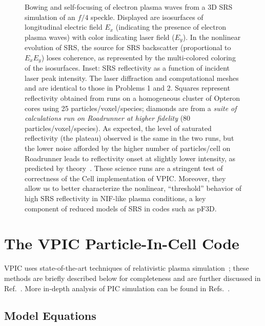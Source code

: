 \documentclass[journal,twoside]{IEEEtran}
\begin{document}
\begin{figure}
\begin{center}
\caption{Bowing and self-focusing of electron plasma waves from a
3D SRS simulation of an $f/4$ speckle. Displayed are isosurfaces of
longitudinal electric field $E_x$ (indicating the presence of electron plasma waves) 
with color indicating laser field ($E_y$).  In the nonlinear evolution of SRS, the source
for SRS backscatter (proportional to $E_x E_y$) loses coherence, as represented
by the multi-colored coloring of the isosurfaces.
Inset: SRS reflectivity as a function of incident laser peak intensity.  The laser 
diffraction and computational meshes and are identical to those in Problems 1 and 2.  
Squares represent reflectivity obtained from runs on a homogeneous cluster of Opteron cores 
using 25 particles/voxel/species; diamonds are from a \textit{suite of calculations run on 
Roadrunner at higher fidelity} (80 particles/voxel/species).
As expected, the level of saturated reflectivity
(the plateau) observed is the same in the two runs, but the lower noise afforded 
by the higher number of particles/cell on Roadrunner leads to reflectivity onset 
at slightly lower intensity, as predicted by theory~\cite{Yin_et_al_Phys_Plasmas_2006}.  
These science runs are a stringent test of correctness of the Cell implementation 
of VPIC.  Moreover, they allow us to better characterize the nonlinear, ``threshold'' 
behavior of high SRS reflectivity in NIF-like plasma conditions, a key component of 
reduced models of SRS in codes such as pF3D. 
}
\label{fig:lpi}
\end{center}
\end{figure}

\section{The VPIC Particle-In-Cell Code}

VPIC uses state-of-the-art techniques of relativistic plasma
simulation~\cite{Blahovec_et_al_2000,Eastwood_et_al_1995,Jones_et_al_1996,Kwan_Snell_1985,Nieter_Cary_2004,Verboncoeur_et_al_1995};
these methods are briefly described below for completeness and are
further discussed in Ref.~\cite{Bowers_et_al_Phys_Plasmas_2007}.  More
in-depth analysis of PIC simulation can be found in
Refs.~\cite{Birdsall_Langdon_1985,Hockney_Eastwood_1988}.

\subsection{Model Equations}
\end{document}
